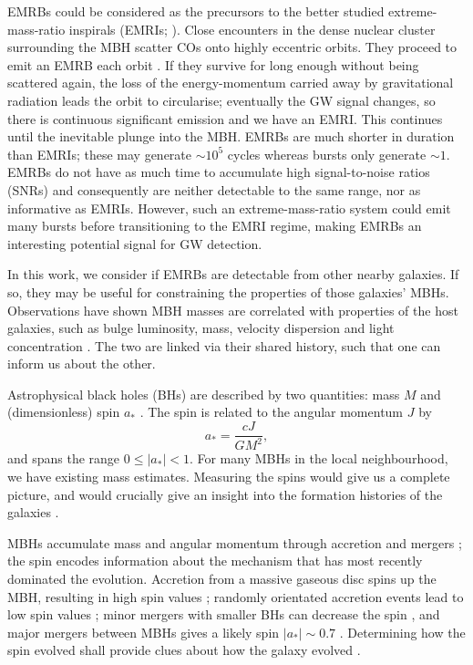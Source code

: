 \documentclass[useAMS,usedcolumn,usegraphicx,usenatbib]{mn2e}
\begin{document}
EMRBs could be considered as the precursors to the better studied extreme-mass-ratio inspirals (EMRIs; \citealt{Amaro-Seoane2007}). Close encounters in the dense nuclear cluster surrounding the MBH scatter COs onto highly eccentric orbits. They proceed to emit an EMRB each orbit \citep*{Rubbo2006}. If they survive for long enough without being scattered again, the loss of the energy-momentum carried away by gravitational radiation leads the orbit to circularise; eventually the GW signal changes, so there is continuous significant emission and we have an EMRI. This continues until the inevitable plunge into the MBH. EMRBs are much shorter in duration than EMRIs; these may generate $\sim10^5$ cycles whereas bursts only generate $\sim1$. EMRBs do not have as much time to accumulate high signal-to-noise ratios (SNRs) and consequently are neither detectable to the same range, nor as informative as EMRIs. However, such an extreme-mass-ratio system could emit many bursts before transitioning to the EMRI regime, making EMRBs an interesting potential signal for GW detection.

In this work, we consider if EMRBs are detectable from other nearby galaxies. If so, they may be useful for constraining the properties of those galaxies' MBHs. Observations have shown MBH masses are correlated with properties of the host galaxies, such as bulge luminosity, mass, velocity dispersion and light concentration \citep[e.g.,][]{Kormendy1995, Magorrian1998, Graham2011}. The two are linked via their shared history, such that one can inform us about the other.

Astrophysical black holes (BHs) are described by two quantities: mass $M$ and (dimensionless) spin $a_\ast$ \citep{Chandrasekhar1998}. The spin is related to the angular momentum $J$ by
\begin{equation}
a_\ast = \frac{cJ}{GM^2},
\end{equation}
and spans the range $0 \leq |a_\ast| < 1$. For many MBHs in the local neighbourhood, we have existing mass estimates. Measuring the spins would give us a complete picture, and would crucially give an insight into the formation histories of the galaxies \citep{Dotti2013,Volonteri2012a}.

MBHs accumulate mass and angular momentum through accretion and mergers \citep{Volonteri2010, Yu2002}; the spin encodes information about the mechanism that has most recently dominated the evolution. Accretion from a massive gaseous disc spins up the MBH, resulting in high spin values \citep{Volonteri2005}; randomly orientated accretion events lead to low spin values \citep*{King2006, King2008}; minor mergers with smaller BHs can decrease the spin \citep*{Hughes2003, Gammie2004}, and major mergers between MBHs gives a likely spin $|a_\ast| \sim 0.7$ \citep{Berti2008, Gonzalez2007}. Determining how the spin evolved shall provide clues about how the galaxy evolved \citep{Barausse2012}.
\end{document}
